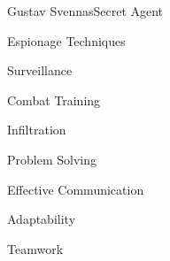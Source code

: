 \documentclass{article}
\begin{document}
\begin{cv}[avatar]{Gustav Svennas}{Secret Agent}

\begin{cvitem}
    Espionage Techniques
\end{cvitem}

\cvseparator
\begin{cvitem}
    Surveillance
\end{cvitem}

\cvseparator
\begin{cvitem}
    Combat Training
\end{cvitem}

\cvseparator
\begin{cvitem}
    Infiltration
\end{cvitem}

\cvseparator
\begin{cvitem}
    Problem Solving
\end{cvitem}

\cvseparator
\begin{cvitem}
    Effective Communication
\end{cvitem}

\cvseparator
\begin{cvitem}
    Adaptability
\end{cvitem}

\cvseparator
\begin{cvitem}
    Teamwork
\end{cvitem}





\end{cv}
\end{document}
